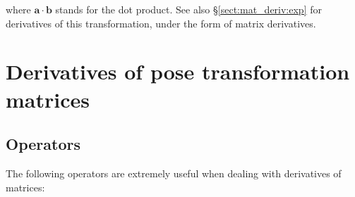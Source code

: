 \documentclass[a4paper,11pt]{report}
\begin{document}
\noindent where $\mathbf{a} \cdot \mathbf{b}$ stands for the dot product.
See also \S\ref{sect:mat_deriv:exp} for derivatives of this transformation,
under the form of matrix derivatives.


\chapter{Derivatives of pose transformation matrices}
\label{chap:mat_deriv}

\section{Operators}
\label{sect:mat_deriv:ops}

The following operators are extremely useful when dealing with derivatives of matrices:
\end{document}
